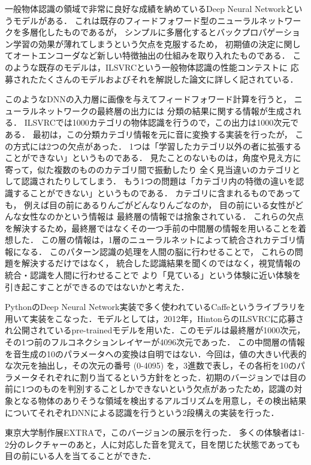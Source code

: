 一般物体認識の領域で非常に良好な成績を納めているDeep Neural Networkというモデルがある．
これは既存のフィードフォワード型のニューラルネットワークを多層化したものであるが，
シンプルに多層化するとバックプロパゲーション学習の効果が薄れてしまうという欠点を克服するため，
初期値の決定に関してオートエンコーダなど新しい特徴抽出の仕組みを取り入れたものである．
このような既存のモデルは，ILSVRCという一般物体認識の性能コンテストに
応募されたたくさんのモデルおよびそれを解説した論文に詳しく記されている．

このようなDNNの入力層に画像を与えてフィードフォワード計算を行うと，
ニューラルネットワークの最終層の出力には
分類の結果に関する情報が生成される．
ILSVRCでは1000カテゴリの物体認識を行うので，この出力は1000次元である．
最初は，この分類カテゴリ情報を元に音に変換する実装を行ったが，
この方式には2つの欠点があった．
1つは「学習したカテゴリ以外の者に拡張することができない」というものである．
見たことのないものは，角度や見え方に寄って，似た複数のもののカテゴリ間で振動したり
全く見当違いのカテゴリとして認識されたりしてしまう．
もう1つの問題は「カテゴリ内の特徴の違いを認識することができない」というものである．
カテゴリに含まれるものであっても，
例えば目の前にあるりんごがどんなりんごなのか，
目の前にいる女性がどんな女性なのかという情報は
最終層の情報では捨象されている．
これらの欠点を解決するため，最終層ではなくその一つ手前の中間層の情報を用いることを着想した．
この層の情報は，1層のニューラルネットによって統合されカテゴリ情報になる．
このパターン認識の処理を人間の脳に行わせることで，
これらの問題を解決するだけではなく，
統合した認識結果を聞くのではなく，視覚情報の統合・認識を人間に行わせることで
より「見ている」という体験に近い体験を引き起こすことができるのではないかと考えた．

PythonのDeep Neural Network実装で多く使われているCaffeというライブラリを用いて実装をこなった．モデルとしては，2012年，HintonらのILSVRCに応募され公開されているpre-trainedモデルを用いた．このモデルは最終層が1000次元，その1つ前のフルコネクションレイヤーが4096次元であった．
この中間層の情報を音生成の10のパラメータへの変換は自明ではない．今回は，値の大きい代表的な次元を抽出し，その次元の番号 (0-4095) を，3進数で表し，その各桁を10のパラメータそれぞれに割り当てるという方針をとった．初期のバージョンでは目の前に1つのものを判別することしかできないという欠点があったため，認識の対象となる物体のありそうな領域を検出するアルゴリズムを用意し，その検出結果についてそれぞれDNNによる認識を行うという2段構えの実装を行った．

東京大学制作展EXTRAで，このバージョンの展示を行った．
多くの体験者は1-2分のレクチャーのあと，人に対応した音を覚えて，目を閉じた状態であっても目の前にいる人を当てることができた．

